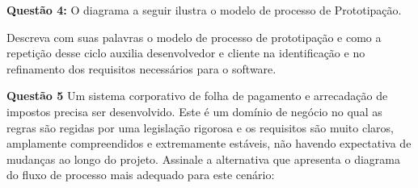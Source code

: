 \documentclass[12pt,a4paper]{article}
\newcommand{\resposta}[1]{
\noindent
\framebox[\textwidth]{
\begin{minipage}{0.98\textwidth}
\vspace*{#1}\null
\end{minipage}
}
}
\begin{document}
\vspace{0.8cm}
\textbf{Questão 4:} O diagrama a seguir ilustra o modelo de processo de Prototipação.

\begin{center}
\end{center}

\vspace{0.4cm}
Descreva com suas palavras o modelo de processo de prototipação e como a repetição desse ciclo auxilia desenvolvedor e cliente na identificação e no refinamento dos requisitos necessários para o software.

\vspace{0.2cm}
\resposta{8cm}

\vspace{0.8cm}
\textbf{Questão 5} Um sistema corporativo de folha de pagamento e arrecadação de impostos precisa ser desenvolvido. Este é um domínio de negócio no qual as regras são regidas por uma legislação rigorosa e os requisitos são muito claros, amplamente compreendidos e extremamente estáveis, não havendo expectativa de mudanças ao longo do projeto. Assinale a alternativa que apresenta o diagrama do fluxo de processo mais adequado para este cenário:
\end{document}
